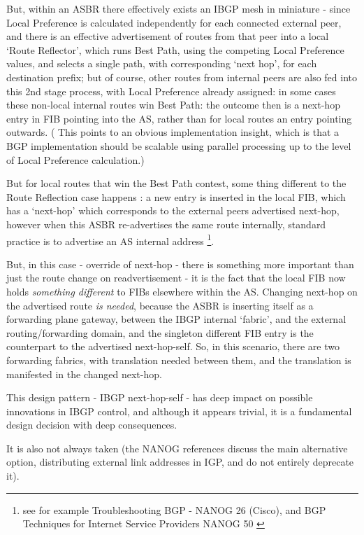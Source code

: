 But, within an ASBR there effectively exists an IBGP mesh in miniature - since Local Preference is calculated independently for each connected external peer, and there is an effective advertisement of routes from that peer into a local `Route Reflector', which runs Best Path, using the competing Local Preference values, and selects a single path, with corresponding `next hop', for each destination prefix; but of course, other routes  from internal peers are also fed into this 2nd stage process, with Local Preference already assigned: in some cases these non-local internal routes win Best Path: the outcome then is a next-hop entry in FIB pointing into the AS, rather than for local routes an entry pointing outwards.
( This points to an obvious implementation insight, which is that a BGP implementation should be scalable using parallel processing up to the level of Local Preference calculation.)

But for local routes that win the Best Path contest, some thing different to the Route Reflection case happens : a new entry is inserted in the local FIB, which has a `next-hop' which corresponds to the external peers advertised  next-hop, however when this ASBR re-advertises  the same route internally, standard practice is to advertise an AS internal address \footnote{see for example Troubleshooting BGP - NANOG 26 (Cisco)\cite{pfs2002}, and BGP Techniques for Internet Service Providers NANOG 50 \cite{pfs2010}}.

But, in this case - override of next-hop - there is something more important than just the route change on readvertisement - it is the fact that the local FIB now holds\textit{ something different} to FIBs elsewhere within the AS.  Changing next-hop on the advertised route \textit{is needed}, because the ASBR is inserting itself as a forwarding plane gateway, between the IBGP internal `fabric', and the external routing/forwarding domain, and the singleton different FIB entry is the counterpart to the advertised next-hop-self.  So, in this scenario, there are two forwarding fabrics, with translation needed between them, and the translation is manifested in the changed next-hop.

\medskip

This design pattern - IBGP next-hop-self - has deep impact on possible innovations in IBGP control, and although it appears trivial, it is a fundamental design decision with deep consequences.

It is also not always taken (the NANOG references discuss the main alternative option, distributing external link addresses in IGP, and do not entirely deprecate it).


